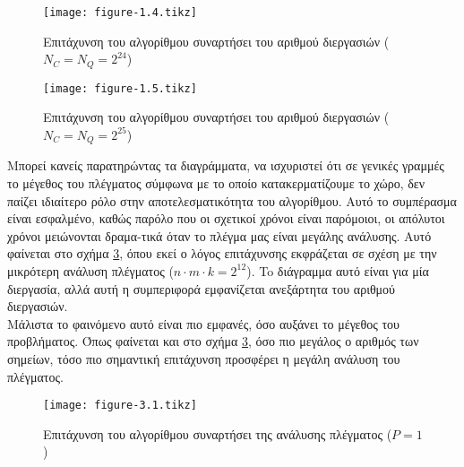 \documentclass[11pt,a4paper,titlepage]{article}
\begin{document}
	\begin{figure}[h!]
		\centering
		\texttt{[image: figure-1.4.tikz]}
		\caption{Επιτάχυνση του αλγορίθμου συναρτήσει του αριθμού διεργασιών ($N_C = N_Q = 2^{24}$)}
		\label{fig:n24}		
	\end{figure}
	
	\begin{figure}[h]
		\centering
		\texttt{[image: figure-1.5.tikz]}
		\caption{Επιτάχυνση του αλγορίθμου συναρτήσει του αριθμού διεργασιών ($N_C = N_Q = 2^{25}$)}
		\label{fig:n25}
	\end{figure}	

	Μπορεί κανείς παρατηρώντας τα διαγράμματα, να ισχυριστεί ότι σε γενικές γραμμές το μέγεθος του πλέγματος σύμφωνα με το οποίο κατακερματίζουμε το χώρο, δεν παίζει ιδιαίτερο ρόλο στην αποτελεσματικότητα του αλγορίθμου. Αυτό το συμπέρασμα είναι εσφαλμένο, καθώς παρόλο που οι σχετικοί χρόνοι είναι παρόμοιοι, οι απόλυτοι χρόνοι μειώνονται δραμα-τικά όταν το πλέγμα μας είναι μεγάλης ανάλυσης. Αυτό φαίνεται στο σχήμα \ref{fig:p1}, όπου εκεί ο λόγος επιτάχυνσης εκφράζεται σε σχέση με την μικρότερη ανάλυση πλέγματος ($n\cdot m\cdot k = 2^{12}$). To διάγραμμα αυτό είναι για μία διεργασία, αλλά αυτή η συμπεριφορά εμφανίζεται ανεξάρτητα του αριθμού διεργασιών.\\
	
	Μάλιστα το φαινόμενο αυτό είναι πιο εμφανές, όσο αυξάνει το μέγεθος του προβλήματος. Όπως φαίνεται και στο σχήμα \ref{fig:p1}, όσο πιο μεγάλος ο αριθμός των σημείων, τόσο πιο σημαντική επιτάχυνση προσφέρει η μεγάλη ανάλυση του πλέγματος.\\
	
	\begin{figure}[h!]
		\centering
		\texttt{[image: figure-3.1.tikz]}
		\caption{Επιτάχυνση του αλγορίθμου συναρτήσει της ανάλυσης πλέγματος ($P = 1$)}
		\label{fig:p1}
	\end{figure}
	
\end{document}
